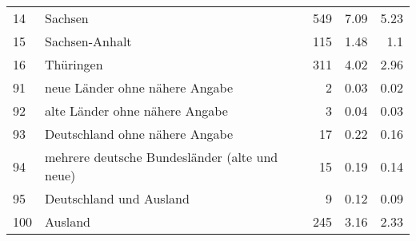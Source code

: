 \begin{longtable}{lXrrr}
        14 & \multicolumn{1}{X}{Sachsen} & %
          \num{549} &
          \num[round-mode=places,round-precision=2]{7,09} &
          \num[round-mode=places,round-precision=2]{5,23} \\

        15 & \multicolumn{1}{X}{Sachsen-Anhalt} & %
          \num{115} &
          \num[round-mode=places,round-precision=2]{1,48} &
          \num[round-mode=places,round-precision=2]{1,1} \\

        16 & \multicolumn{1}{X}{Thüringen} & %
          \num{311} &
          \num[round-mode=places,round-precision=2]{4,02} &
          \num[round-mode=places,round-precision=2]{2,96} \\

        91 & \multicolumn{1}{X}{neue Länder ohne nähere Angabe} & %
          \num{2} &
          \num[round-mode=places,round-precision=2]{0,03} &
          \num[round-mode=places,round-precision=2]{0,02} \\

        92 & \multicolumn{1}{X}{alte Länder ohne nähere Angabe} & %
          \num{3} &
          \num[round-mode=places,round-precision=2]{0,04} &
          \num[round-mode=places,round-precision=2]{0,03} \\

        93 & \multicolumn{1}{X}{Deutschland ohne nähere Angabe} & %
          \num{17} &
          \num[round-mode=places,round-precision=2]{0,22} &
          \num[round-mode=places,round-precision=2]{0,16} \\

        94 & \multicolumn{1}{X}{mehrere deutsche Bundesländer (alte und neue)} & %
          \num{15} &
          \num[round-mode=places,round-precision=2]{0,19} &
          \num[round-mode=places,round-precision=2]{0,14} \\

        95 & \multicolumn{1}{X}{Deutschland und Ausland} & %
          \num{9} &
          \num[round-mode=places,round-precision=2]{0,12} &
          \num[round-mode=places,round-precision=2]{0,09} \\

        100 & \multicolumn{1}{X}{Ausland} & %
          \num{245} &
          \num[round-mode=places,round-precision=2]{3,16} &
          \num[round-mode=places,round-precision=2]{2,33} \\


\end{longtable}
